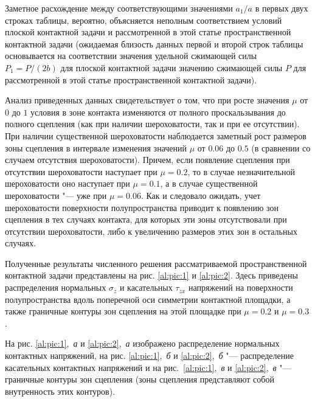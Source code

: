 





Заметное расхождение между соответствующими значениями ${a_{1}/a} $ в первых двух строках таблицы, вероятно, объясняется неполным соответствием условий плоской контактной задачи \cite{al:bib20} и рассмотренной в этой статье пространственной контактной задачи (ожидаемая близость данных первой и второй строк таблицы основывается на соответствии значения удельной сжимающей силы $P_{1}=P/(2b)$ для плоской контактной задачи \cite{al:bib20} значению сжимающей силы $P$ для рассмотренной в этой статье пространственной контактной задачи).



Анализ приведенных данных свидетельствует о том, что при росте значения $\mu $ от $0$ до $1$ условия в зоне контакта изменяются от полного проскальзывания до полного сцепления (как при наличии шероховатости, так и при ее отсутствии). При наличии существенной шероховатости наблюдается заметный рост размеров зоны сцепления в интервале изменения значений $\mu $ от $0.06$ до $0.5$ (в сравнении со случаем отсутствия шероховатости). Причем, если появление сцепления при отсутствии шероховатости наступает при $\mu =0.2$, то в случае незначительной шероховатости оно наступает при $\mu =0.1$, а в случае существенной шероховатости "--- уже при $\mu =0.06$. Как и следовало ожидать, учет шероховатости поверхности полупространства приводит к появлению зон сцепления в тех случаях контакта, для которых эти зоны отсутствовали при отсутствии шероховатости, либо к увеличению размеров этих зон в остальных случаях.



Полученные результаты численного решения рассматриваемой пространственной контактной задачи представлены на рис. \ref{al:pic:1} и \ref{al:pic:2}. Здесь приведены распределения нормальных $\sigma _{z} $ и касательных $\tau _{zx} $ напряжений на поверхности полупространства вдоль поперечной оси симметрии контактной площадки, а также граничные контуры зон сцепления на этой площадке при $\mu =0.2$ и $\mu =0.3$.





На рис. \ref{al:pic:1},~{\sl а} и \ref{al:pic:2},~{\sl а} изображено распределение нормальных контактных напряжений, на рис. \ref{al:pic:1},~{\sl б} и \ref{al:pic:2},~{\sl б} "--- распределение касательных контактных напряжений и на рис.~\ref{al:pic:1},~{\sl в} и \ref{al:pic:2},~{\sl в} "--- граничные контуры зон сцепления (зоны сцепления представляют собой внутренность этих контуров). 

